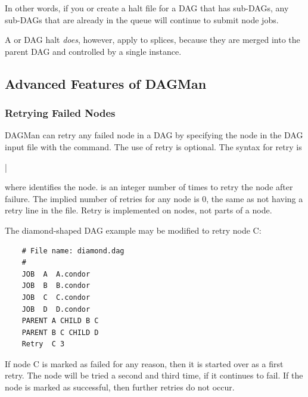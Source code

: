 In other words, if you  or create a halt file for a DAG that
has sub-DAGs, any sub-DAGs that are already in the queue will continue
to submit node jobs.

A  or DAG halt \emph{does}, however, apply to splices,
because they are merged into the parent DAG and controlled by a single
 instance.

\subsection{\label{sec:AdvDAGMan}Advanced Features of DAGMan}


\subsubsection{\label{dagman:retry}Retrying Failed Nodes}

DAGMan can retry any failed node in a DAG by
specifying the node in the DAG input file 
with the  command.
The use of retry is optional.
The syntax for retry is

 | 

where  identifies the node.
 is an integer
number of times to retry the node after failure.
The implied number of retries for any node is 0,
the same as not having a retry line in the file. 
Retry is implemented on nodes, not parts of a node.

The diamond-shaped DAG example may be modified to
retry node C:

\footnotesize
\begin{verbatim}
    # File name: diamond.dag
    #
    JOB  A  A.condor 
    JOB  B  B.condor 
    JOB  C  C.condor	
    JOB  D  D.condor
    PARENT A CHILD B C
    PARENT B C CHILD D
    Retry  C 3
\end{verbatim}
\normalsize

If node C is marked as failed for any reason,
then it is started over as a first retry.
The node will be tried a second and third time,
if it continues to fail.
If the node is marked as successful, then further retries do not occur.


